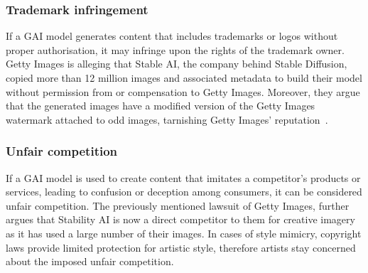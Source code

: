 \documentclass[conference]{IEEEtran}
\begin{document}
\subsubsection{Trademark infringement} 
If a GAI model generates content that includes trademarks or logos without proper authorisation, it may infringe upon the rights of the trademark owner. 
Getty Images is alleging that Stable AI, the company behind Stable Diffusion, copied more than 12 million images and associated metadata to build their model without permission from or compensation to Getty Images. 
Moreover, they argue that the generated images have a modified version of the Getty Images watermark attached to odd images, tarnishing Getty Images’ reputation~\cite{vincent_getty_2023}.
    
\subsubsection{Unfair competition} 
If a GAI model is used to create content that imitates a competitor's products or services, leading to confusion or deception among consumers, it can be considered unfair competition. The previously mentioned lawsuit of Getty Images, further argues that Stability AI is now a direct competitor to them for creative imagery as it has used a large number of their images. In cases of style mimicry, copyright laws provide limited protection for artistic style, therefore artists stay concerned about the imposed unfair competition.  



 


 
\end{document}
